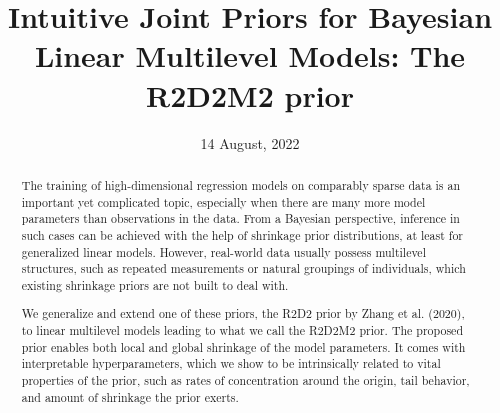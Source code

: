 \documentclass[ba,preprint]{imsart}%
\begin{document}
\begin{frontmatter}

\title{Intuitive Joint Priors for Bayesian Linear Multilevel Models: The R2D2M2 prior}

\date{14 August, 2022}


\begin{abstract}
		\noindent

 	   The training of high-dimensional regression models on comparably sparse data is an important yet complicated topic, especially when there are many more model parameters than observations in the data. From a Bayesian perspective, inference in such cases can be achieved with the help of shrinkage prior distributions, at least for generalized linear models. However, real-world data usually possess multilevel structures, such as repeated measurements or natural groupings of individuals, which existing shrinkage priors are not built to deal with.

        We generalize and extend one of these priors, the R2D2 prior by Zhang et al. (2020), to linear multilevel models leading to what we call the R2D2M2 prior. The proposed prior enables both local and global shrinkage of the model parameters. It comes with interpretable hyperparameters, which we show to be intrinsically related to vital properties of the prior, such as rates of concentration around the origin, tail behavior, and amount of shrinkage the prior exerts.


\end{abstract}
\end{frontmatter}
\end{document}
